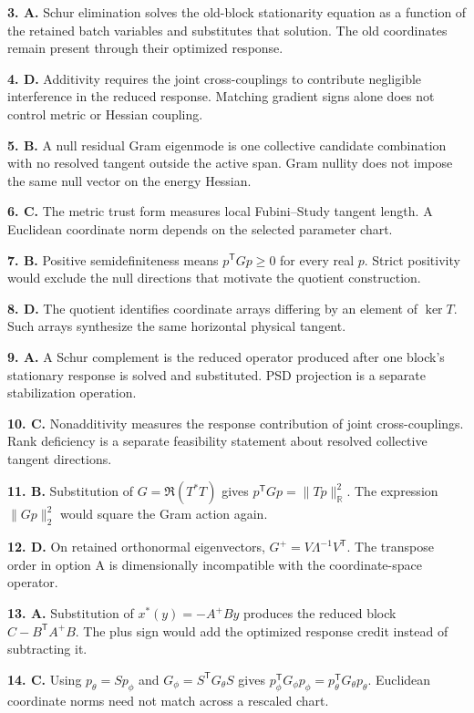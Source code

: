 \documentclass[10pt,twocolumn]{article}
\begin{document}
\textbf{3. A.} Schur elimination solves the old-block stationarity equation as
a function of the retained batch variables and substitutes that solution. The
old coordinates remain present through their optimized response.

\textbf{4. D.} Additivity requires the joint cross-couplings to contribute
negligible interference in the reduced response. Matching gradient signs alone
does not control metric or Hessian coupling.

\textbf{5. B.} A null residual Gram eigenmode is one collective candidate
combination with no resolved tangent outside the active span. Gram nullity does
not impose the same null vector on the energy Hessian.

\textbf{6. C.} The metric trust form measures local Fubini--Study tangent
length. A Euclidean coordinate norm depends on the selected parameter chart.

\textbf{7. B.} Positive semidefiniteness means
\(p^{\mathsf T}Gp\geq0\) for every real \(p\). Strict positivity would exclude
the null directions that motivate the quotient construction.

\textbf{8. D.} The quotient identifies coordinate arrays differing by an
element of \(\ker T\). Such arrays synthesize the same horizontal physical
tangent.

\textbf{9. A.} A Schur complement is the reduced operator produced after one
block's stationary response is solved and substituted. PSD projection is a
separate stabilization operation.

\textbf{10. C.} Nonadditivity measures the response contribution of joint
cross-couplings. Rank deficiency is a separate feasibility statement about
resolved collective tangent directions.

\textbf{11. B.} Substitution of \(G=\Re(T^*T)\) gives
\(p^{\mathsf T}Gp=\|Tp\|_{\mathbb R}^2\). The expression \(\|Gp\|_2^2\)
would square the Gram action again.

\textbf{12. D.} On retained orthonormal eigenvectors,
\(G^+=V\Lambda^{-1}V^{\mathsf T}\). The transpose order in option A is
dimensionally incompatible with the coordinate-space operator.

\textbf{13. A.} Substitution of \(x^*(y)=-A^+By\) produces the reduced block
\(C-B^{\mathsf T}A^+B\). The plus sign would add the optimized response credit
instead of subtracting it.

\textbf{14. C.} Using \(p_\theta=Sp_\phi\) and
\(G_\phi=S^{\mathsf T}G_\theta S\) gives
\(p_\phi^{\mathsf T}G_\phi p_\phi
=p_\theta^{\mathsf T}G_\theta p_\theta\). Euclidean coordinate norms need not
match across a rescaled chart.
\end{document}
